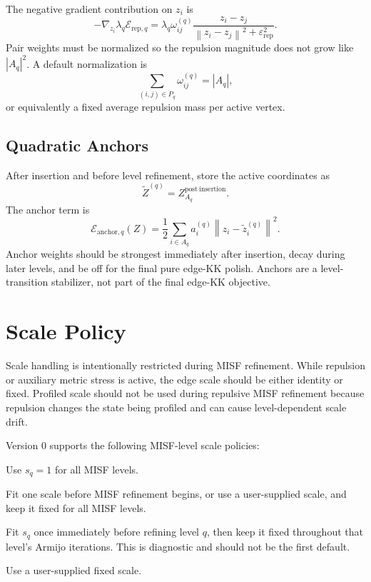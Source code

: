 \documentclass[11pt]{article}
\newcommand{\norm}[1]{\left\lVert #1 \right\rVert}
\newcommand{\eps}{\varepsilon}
\begin{document}
The negative gradient contribution on \(z_i\) is
\[
  -\nabla_{z_i}
  \lambda_q \mathcal{E}_{\mathrm{rep},q}
  =
  \lambda_q \omega_{ij}^{(q)}
  \frac{z_i-z_j}{\norm{z_i-z_j}^2+\eps_{\mathrm{rep}}^2}.
\]
Pair weights must be normalized so the repulsion magnitude does not grow like
\(|A_q|^2\). A default normalization is
\[
  \sum_{(i,j)\in P_q}\omega_{ij}^{(q)} = |A_q|,
\]
or equivalently a fixed average repulsion mass per active vertex.

\subsection{Quadratic Anchors}

After insertion and before level refinement, store the active coordinates as
\[
  \tilde{Z}^{(q)} = Z_{A_q}^{\mathrm{post\ insertion}}.
\]
The anchor term is
\[
  \mathcal{E}_{\mathrm{anchor},q}(Z)
  =
  \frac{1}{2}
  \sum_{i\in A_q}
  a_i^{(q)}
  \norm{z_i-\tilde{z}_i^{(q)}}^2.
\]
Anchor weights should be strongest immediately after insertion, decay during
later levels, and be off for the final pure edge-KK polish. Anchors are a
level-transition stabilizer, not part of the final edge-KK objective.

\section{Scale Policy}

Scale handling is intentionally restricted during MISF refinement. While
repulsion or auxiliary metric stress is active, the edge scale should be either
identity or fixed. Profiled scale should not be used during repulsive MISF
refinement because repulsion changes the state being profiled and can cause
level-dependent scale drift.

Version 0 supports the following MISF-level scale policies:
\begin{description}[leftmargin=2em]
  \item[\texttt{identity}] Use \(s_q=1\) for all MISF levels.
  \item[\texttt{global\_fixed}] Fit one scale before MISF refinement begins, or
  use a user-supplied scale, and keep it fixed for all MISF levels.
  \item[\texttt{level\_fixed}] Fit \(s_q\) once immediately before refining
  level \(q\), then keep it fixed throughout that level's Armijo iterations.
  This is diagnostic and should not be the first default.
  \item[\texttt{user}] Use a user-supplied fixed scale.
\end{description}
\end{document}
